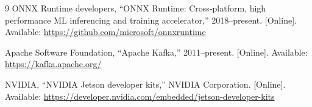 \begin{thebibliography}{9}
 ONNX Runtime developers, ``ONNX Runtime: Cross-platform, high performance ML inferencing and training accelerator,'' 2018--present. [Online]. Available: \url{https://github.com/microsoft/onnxruntime}

 Apache Software Foundation, ``Apache Kafka,'' 2011--present. [Online]. Available: \url{https://kafka.apache.org/}

 NVIDIA, ``NVIDIA Jetson developer kits,'' NVIDIA Corporation. [Online]. Available: \url{https://developer.nvidia.com/embedded/jetson-developer-kits}
\end{thebibliography}
